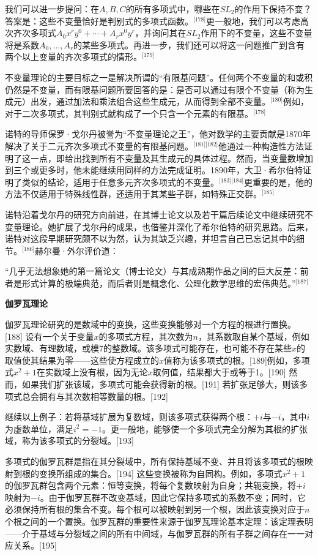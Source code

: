 我们可以进一步提问：在$ A, B, C$的所有多项式中，哪些在$ SL_2$的作用下保持不变？答案是：这些不变量恰好是判别式的多项式函数。\(^\text{[178]}\)更一般地，我们可以考虑高次齐次多项式$A_0 x^r y^0 + \cdots + A_r x^0 y^r$，并询问其在$SL_2$作用下的不变量，这些不变量将是系数$A_0, \ldots, A_r$的某些多项式。再进一步，我们还可以将这一问题推广到含有两个以上变量的齐次多项式的情形。\(^\text{[179]}\)

不变量理论的主要目标之一是解决所谓的“有限基问题”。任何两个不变量的和或积仍然是不变量，而有限基问题所要回答的是：是否可以通过有限个不变量（称为生成元）出发，通过加法和乘法组合这些生成元，从而得到全部不变量。\(^\text{[180]}\)例如，对于二次多项式，其判别式就构成了一个只含一个元素的有限基。\(^\text{[178]}\)

诺特的导师保罗·戈尔丹被誉为“不变量理论之王”，他对数学的主要贡献是1870年解决了关于二元齐次多项式不变量的有限基问题。\(^\text{[181][182]}\)他通过一种构造性方法证明了这一点，即给出找到所有不变量及其生成元的具体过程。然而，当变量数增加到三个或更多时，他未能继续用同样的方法完成证明。1890年，大卫·希尔伯特证明了类似的结论，适用于任意多元齐次多项式的不变量。\(^\text{[183][184]}\)更重要的是，他的方法不仅适用于特殊线性群，还适用于其某些子群，如特殊正交群。\(^\text{[185]}\)

诺特沿着戈尔丹的研究方向前进，在其博士论文以及若干篇后续论文中继续研究不变量理论。她扩展了戈尔丹的成果，也借鉴并深化了希尔伯特的研究思路。后来，诺特对这段早期研究颇不以为然，认为其缺乏兴趣，并坦言自己已忘记其中的细节。\(^\text{[186]}\)赫尔曼·外尔评价道：

“几乎无法想象她的第一篇论文（博士论文）与其成熟期作品之间的巨大反差：前者是形式计算的极端典范，而后者则是概念化、公理化数学思维的宏伟典范。”\(^\text{[187]}\)

\textbf{伽罗瓦理论}

伽罗瓦理论研究的是数域中的变换，这些变换能够对一个方程的根进行置换。[188] 设有一个关于变量$x$的多项式方程，其次数为$n$，其系数取自某个基域，例如实数域、有理数域，或模7的整数域。该多项式可能存在，也可能不存在某些$x$的取值使其结果为零——这些使方程成立的$x$值称为该多项式的根。[189]例如，多项式$x^2 + 1$在实数域上没有根，因为无论$x$取何值，结果都大于或等于1。[190] 然而，如果我们扩张该域，多项式可能会获得新的根。[191] 若扩张足够大，则该多项式总会拥有与其次数相等数量的根。[192]

继续以上例子：若将基域扩展为复数域，则该多项式获得两个根：$+i$与$-i$，其中$i$为虚数单位，满足$i^2 = -1$。更一般地，能够使一个多项式完全分解为其根的扩张域，称为该多项式的分裂域。[193]

多项式的伽罗瓦群是指在其分裂域中，所有保持基域不变、并且将该多项式的根映射到根的变换所组成的集合。[194] 这些变换被称为自同构。例如，多项式$x^2 + 1$的伽罗瓦群包含两个元素：恒等变换，将每个复数映射为自身；共轭变换，将$+i$映射为$-i$。由于伽罗瓦群不改变基域，因此它保持多项式的系数不变；同时，它必须保持所有根的集合不变。每个根可以被映射到另一个根，因此该变换对应于$n$个根之间的一个置换。伽罗瓦群的重要性来源于伽罗瓦理论基本定理：该定理表明——介于基域与分裂域之间的所有中间域，与伽罗瓦群的所有子群之间存在一一对应关系。[195]

